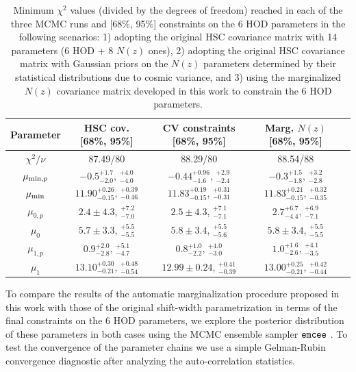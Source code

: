 \documentclass[a4paper,11pt]{article}
\begin{document}
      \begin{table}
        \begin{center}
          \begin{tabular}{c | c c c c} 
            \hline\hline
            Parameter & HSC cov. [68\%, 95\%] & CV constraints [68\%, 95\%] & Marg. $N(z)$ [68\%, 95\%] \\ [0.5ex] 
            \hline
            $\chi^2/\nu$ & 87.49/80 & 88.29/80 & 88.54/88 \\ 
            $\mu_{{\rm min},p}$ & $-0.5^{+1.7}_{-2.0}$, $^{+4.0}_{-4.0}$ & $-0.44^{+0.96}_{-1.6}$, $^{+2.9}_{-2.4}$ & $-0.3^{+1.5}_{-1.8}$, $^{+3.2}_{-2.8}$ \\ [1ex]
            $\mu_{\rm min}$ & $11.90^{+0.26}_{-0.15}$, $^{+0.39}_{-0.46}$ & $11.83^{+0.19}_{-0.15}$, $^{+0.31}_{-0.31}$ & $11.83^{+0.21}_{-0.15}$, $^{+0.32}_{-0.35}$ \\ [1ex]
            $\mu_{0,p}$ & $2.4\pm 4.3$, $^{+7.2}_{-7.0}$ & $2.5\pm 4.3$, $^{+7.1}_{-7.1}$ & $2.7^{+6.7}_{-4.4}$, $^{+6.9}_{-7.1}$ \\ [1ex]
            $\mu_{0}$ & $5.7\pm 3.3$, $^{+5.5}_{-5.5}$ & $5.8\pm 3.4$, $^{+5.5}_{-5.6}$ & $5.8\pm 3.4$, $^{+5.5}_{-5.5}$ \\ [1ex]
            $\mu_{1,p}$ & $0.9^{+2.0}_{-2.8}$, $^{+5.1}_{-4.7}$ & $0.8^{+1.0}_{-2.2}$, $^{+4.0}_{-3.0}$ & $1.0^{+1.6}_{-2.6}$, $^{+4.1}_{-3.5}$ \\ [1ex]
            $\mu_{1}$ & $13.10^{+0.30}_{-0.21}$, $^{+0.48}_{-0.54}$ & $12.99\pm 0.24$, $^{+0.41}_{-0.39}$ & $13.00^{+0.25}_{-0.21}$, $^{+0.42}_{-0.44}$ \\ [1ex]
            \hline\hline
          \end{tabular}
        \end{center}
        \caption{Minimum $\chi^2$ values (divided by the degrees of freedom) reached in each of the three MCMC runs and [68\%, 95\%] constraints on the 6 HOD parameters in the following scenarios: 1) adopting the original HSC covariance matrix with 14 parameters (6 HOD + 8 $N(z)$ ones), 2) adopting the original HSC covariance matrix with Gaussian priors on the $N(z)$ parameters determined by their statistical distributions due to cosmic variance, and 3) using the marginalized $N(z)$ covariance matrix developed in this work to constrain the 6 HOD parameters.}\label{tab:chi2_fid}
      \end{table}

      To compare the results of the automatic marginalization procedure proposed in this work with those of the original shift-width parametrization in terms of the final constraints on the 6 HOD parameters, we explore the posterior distribution of these parameters in both cases using the MCMC ensemble sampler ${\tt emcee}$ \cite{2013PASP..125..306F}. To test the convergence of the parameter chains we use a simple Gelman-Rubin convergence diagnostic after analyzing the auto-correlation statistics.
\end{document}
